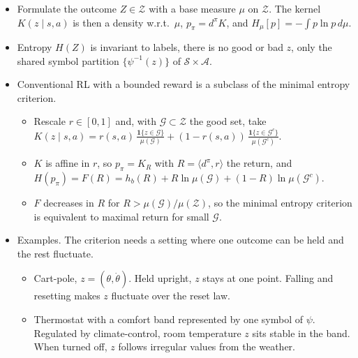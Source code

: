 \documentclass[10pt]{article}
\begin{document}
\begin{itemize}
  \item Formulate the outcome $Z \in \mathcal Z$ with a base measure $\mu$ on $\mathcal Z$. The kernel $K(z \mid s,a)$ is then a density w.r.t.\ $\mu$, $p_\pi = d^\pi K$, and $H_\mu[p] = -\int p \ln p \, d\mu$.
  \item Entropy $H(Z)$ is invariant to labels, there is no good or bad $z$, only the shared symbol partition $\{\psi^{-1}(z)\}$ of $\mathcal S \times \mathcal A$.
  \item Conventional RL with a bounded reward is a subclass of the minimal entropy criterion.
  \begin{itemize}
    \item {Rescale $r \in [0,1]$ and, with $\mathcal G \subset \mathcal Z$ the good set, take $K(z \mid s,a) = r(s,a)\,\frac{\mathbf 1\{z \in \mathcal G\}}{\mu(\mathcal G)} + (1-r(s,a))\,\frac{\mathbf 1\{z \in \mathcal G^c\}}{\mu(\mathcal G^c)}$.}
    \item {$K$ is affine in $r$, so $p_\pi = K_{R}$ with $R = \langle d^\pi, r \rangle$ the return, and $H(p_\pi) = F(R) = h_b(R) + R \ln \mu(\mathcal G) + (1-R) \ln \mu(\mathcal G^c)$.}
    \item {$F$ decreases in $R$ for $R > \mu(\mathcal G)/\mu(\mathcal Z)$, so the minimal entropy criterion is equivalent to maximal return for small $\mathcal G$.}
  \end{itemize}
  \item Examples. The criterion needs a setting where one outcome can be held and the rest fluctuate.
  \begin{itemize}
    \item Cart-pole, $z = (\theta,\dot\theta)$. Held upright, $z$ stays at one point. Falling and resetting makes $z$ fluctuate over the reset law.
    \item Thermostat with a comfort band represented by one symbol of $\psi$. Regulated by climate-control, room temperature $z$ sits stable in the band. When turned off, $z$ follows irregular values from the weather.
  \end{itemize}
\end{itemize}
\end{document}
